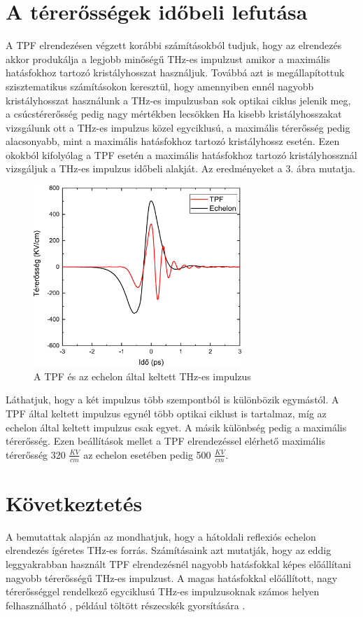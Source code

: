 \documentclass[12pt, a4paper]{article}
\begin{document}
\section*{A térerősségek időbeli lefutása}
A TPF elrendezésen végzett korábbi számításokból tudjuk, hogy az elrendezés akkor produkálja a legjobb minőségű THz-es impulzust amikor a maximális hatásfokhoz tartozó kristályhosszat használjuk. Továbbá azt is megállapítottuk szisztematikus számításokon keresztül, hogy amennyiben ennél nagyobb kristályhosszat használunk a THz-es impulzusban sok optikai ciklus jelenik meg, a csúcstérerősség pedig nagy mértékben lecsökken Ha kisebb kristályhosszakat vizsgálunk ott a THz-es impulzus közel egyciklusú, a maximális térerősség pedig alacsonyabb, mint a maximális hatásfokhoz tartozó kristályhossz esetén. Ezen okokból kifolyólag a TPF esetén a maximális hatásfokhoz tartozó kristályhossznál vizsgáljuk a THz-es impulzus időbeli alakját. Az eredményeket a 3. ábra mutatja.
\begin{figure}[H]
\centering
\includegraphics[width = 0.7\textwidth]{Origin/graph2.pdf}
\caption{A TPF és az echelon által keltett THz-es impulzus}
\end{figure}
Láthatjuk, hogy a két impulzus több szempontból is különbözik egymástól. A TPF által keltett impulzus egynél több optikai ciklust is tartalmaz, míg az echelon által keltett impulzus csak egyet. A másik különbség pedig a maximális térerősség. Ezen beállítások mellet a TPF elrendezéssel elérhető maximális térerősség 320 $\frac{KV}{cm}$ az echelon esetében pedig 500 $\frac{KV}{cm}$.
\section*{Következtetés}
A bemutattak alapján az mondhatjuk, hogy a hátoldali reflexiós echelon elrendezés ígéretes THz-es forrás. Számításaink azt mutatják, hogy az eddig leggyakrabban használt TPF elrendezésnél nagyobb hatásfokkal képes előállítani nagyobb térerősségű THz-es impulzust. A magas hatásfokkal előállított, nagy térerősséggel rendelkező egyciklusú THz-es impulzusoknak számos helyen felhasználható \cite{zhang2017extreme}, például töltött részecskék gyorsítására \cite{nanni2015terahertz}.
\singlespace
\printbibliography[title = Irodalomjegszék]
\end{document}
